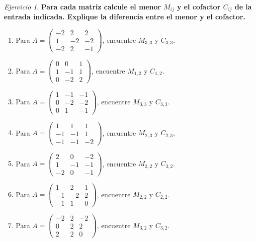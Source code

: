 \documentclass[12pt]{article}
\theoremstyle{remark}
\newtheorem{Ejer}[definicion]{Ejercicio}
\begin{document}
\begin{Ejer}

\textbf{Para cada matriz calcule el menor $M_{ij}$ y el cofactor $C_{ij}$ de la entrada indicada. Explique la diferencia entre el menor y el cofactor.}
\begin{enumerate}[start=175]

\item Para $A=\begin{pmatrix}-2&2&2\\1&-2&-2\\-2&2&-1\end{pmatrix}$, encuentre $M_{3,3}$ y $C_{3,3}$.

\item Para $A=\begin{pmatrix}0&0&1\\1&-1&1\\0&-2&2\end{pmatrix}$, encuentre $M_{1,2}$ y $C_{1,2}$.

\item Para $A=\begin{pmatrix}1&-1&-1\\0&-2&-2\\0&1&-1\end{pmatrix}$, encuentre $M_{3,3}$ y $C_{3,3}$.

\item Para $A=\begin{pmatrix}1&1&1\\-1&-1&1\\-1&-1&-2\end{pmatrix}$, encuentre $M_{2,3}$ y $C_{2,3}$.

\item Para $A=\begin{pmatrix}2&0&-2\\1&-1&-1\\-2&0&-1\end{pmatrix}$, encuentre $M_{3,2}$ y $C_{3,2}$.

\item Para $A=\begin{pmatrix}1&2&1\\-1&-2&2\\-1&1&0\end{pmatrix}$, encuentre $M_{2,2}$ y $C_{2,2}$.

\item Para $A=\begin{pmatrix}-2&2&-2\\0&2&2\\2&2&0\end{pmatrix}$, encuentre $M_{3,2}$ y $C_{3,2}$.


\end{enumerate}
\end{Ejer}
\end{document}

